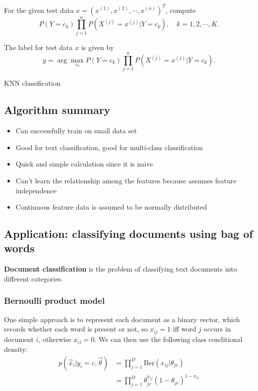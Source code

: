 \begin{refsection}
\begin{algorithm}[H]
	For the given test data $x=\left(x^{(1)}, x^{(2)}, \cdots, x^{(n)}\right)^{T}$, compute
	$$P\left(Y=c_{k}\right) \prod_{j=1}^{n} P\left(X^{(j)}=x^{(j)} | Y=c_{k}\right), \quad k=1,2, \cdots, K.$$
	
	The label for test data $x$ is given by
	$$y=\arg \max _{\varepsilon_{k}} P\left(Y=c_{k}\right) \prod_{j=1}^{n} P\left(X^{(j)}=x^{(j)} | Y=c_{k}\right).$$
	
	
	\caption{KNN classification}
\end{algorithm}


\subsection{Algorithm summary}

\begin{remark}[advantages]\hfill
\begin{itemize}
	\item Can successfully train on small data set
	\item Good for text classification, good for multi-class classification
	\item Quick and simple calculation since it is naive
\end{itemize}	
\end{remark}

\begin{remark}[disadvantages]
\begin{itemize}
	\item Can’t learn the relationship among the features because assumes feature independence
	\item Continuous feature data is assumed to be normally distributed
\end{itemize}	
\end{remark}


\subsection{Application: classifying documents using bag of words}
\textbf{Document classification} is the problem of classifying text documents into different categories.


\subsubsection{Bernoulli product model}
One simple approach is to represent each document as a binary vector, which records whether each word is present or not, so $x_{ij} =1$ iff word $j$ occurs in document $i$, otherwise $x_{ij}=0$. We can then use the following class conditional density:
\begin{equation}\begin{split}
p(\vec{x}_i|y_i=c,\vec{\theta}) & =\prod\limits_{j=1}^D \mathrm{Ber}(x_{ij}|\theta_{jc}) \\
& =\prod\limits_{j=1}^D \theta_{jc}^{x_{ij}}(1-\theta_{jc})^{1-x_{ij}}
\end{split}\end{equation}


\end{refsection}
